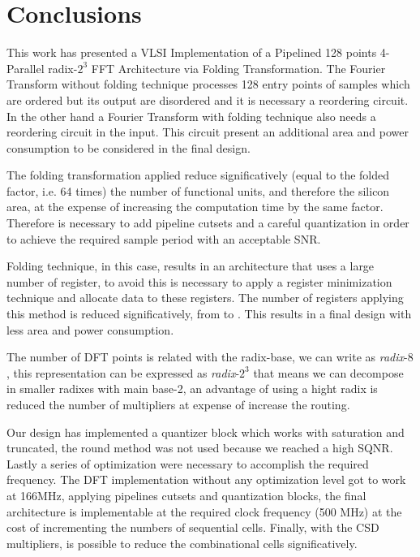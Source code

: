 \documentclass[journal,comsoc]{IEEEtran}
\begin{document}
\section{Conclusions}\label{sec:conclusions}
This work has presented a VLSI Implementation of a Pipelined 128 points 4-Parallel radix-$2^3$ FFT Architecture via Folding Transformation. The Fourier Transform without folding technique processes 128 entry points of samples which are ordered but its output are disordered and it is necessary a reordering circuit. In the other hand a Fourier Transform with folding technique also needs a reordering circuit in the input. This circuit present an additional area and power consumption to be considered in the final design. 

The folding transformation applied reduce significatively (equal to the folded factor, i.e. 64 times) the number of functional units, and therefore the silicon area, at the expense of increasing the computation time by the same factor. Therefore is necessary to add pipeline cutsets and a careful quantization in order to achieve the required sample period with an acceptable SNR.

Folding technique, in this case, results in an architecture that uses a large number of register, to avoid this is necessary to apply a register minimization technique and allocate data to these registers. The number of registers applying this method is reduced significatively, from  to . This results in a final design with less area and power consumption. %

The number of DFT points is related with the radix-base, we can write as \textit{radix}-$8$, this representation can be expressed as \textit{radix}-$2^3$ that means we can decompose in smaller radixes with main base-2, an advantage of using a hight radix is reduced the number of multipliers at expense of increase the routing.

Our design has implemented a quantizer block which works with saturation and truncated, the round method was not used because we reached a high SQNR. Lastly a series of optimization were necessary to accomplish the required frequency. The DFT implementation without any optimization level got to work at 166MHz, applying pipelines cutsets and quantization blocks, the final architecture is implementable at the required clock frequency (500 MHz) at the cost of incrementing the numbers of sequential cells. Finally, with the CSD multipliers, is possible to reduce the combinational cells significatively. 





\end{document}
